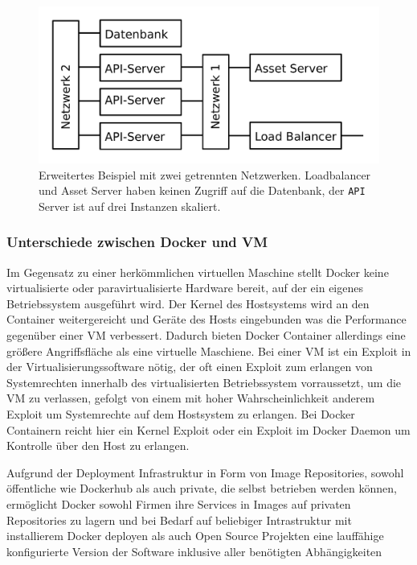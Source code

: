\begin{figure}
  \includegraphics[width=\columnwidth]{images/docker-services-example.pdf}

  \caption {Erweitertes Beispiel mit zwei getrennten Netzwerken. Loadbalancer
    und Asset   Server haben keinen Zugriff auf die Datenbank, der \texttt{API}
    Server ist auf drei Instanzen skaliert.}
  \label{fig:docker-example-extended}
\end{figure}

\subsubsection{Unterschiede zwischen Docker und VM}

Im Gegensatz zu einer herkömmlichen virtuellen Maschine stellt Docker keine
virtualisierte oder paravirtualisierte Hardware bereit, auf der ein eigenes
Betriebssystem ausgeführt wird. Der Kernel des Hostsystems wird an den Container
weitergereicht und Geräte des Hosts eingebunden was die Performance gegenüber
einer VM verbessert. Dadurch bieten Docker Container allerdings eine größere
Angriffsfläche als eine virtuelle Maschiene. Bei einer VM ist ein Exploit in der
Virtualisierungssoftware nötig, der oft einen Exploit zum erlangen von
Systemrechten innerhalb des virtualisierten Betriebssystem vorraussetzt, um die
VM zu verlassen, gefolgt von einem mit hoher Wahrscheinlichkeit anderem Exploit
um Systemrechte auf dem Hostsystem zu erlangen. Bei Docker Containern reicht
hier ein Kernel Exploit oder ein Exploit im Docker Daemon um Kontrolle über den
Host zu erlangen.

Aufgrund der Deployment Infrastruktur in Form von Image Repositories, sowohl
öffentliche wie Dockerhub als auch private, die selbst betrieben werden können,
ermöglicht Docker sowohl Firmen ihre Services in Images auf privaten
Repositories zu lagern und bei Bedarf auf beliebiger Intrastruktur mit
installierem Docker deployen als auch Open Source Projekten eine lauffähige
konfigurierte Version der Software inklusive aller benötigten Abhängigkeiten 

